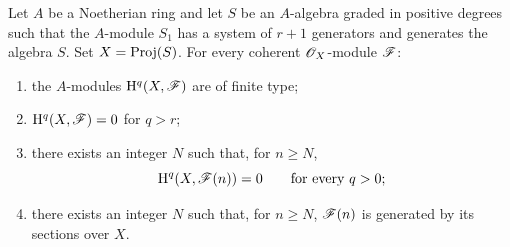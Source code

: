 \begin{proposition}[2.2.2]
\label{III.2.2.2}
Let $A$ be a Noetherian ring and let $S$ be an $A$-algebra graded in positive degrees such that the $A$-module $S_1$ has a system of $r+1$ generators and generates the algebra $S$.
Set $X=\operatorname{Proj}(S)$.
For every coherent $\mathscr{O}_X$-module $\mathscr{F}$:
\begin{enumerate}
  \item[{\rm(i)}] the $A$-modules $\mathrm{H}^q(X,\mathscr{F})$ are of finite type;
  \item[{\rm(ii)}] $\mathrm{H}^q(X,\mathscr{F})=0$ for $q>r$;
  \item[{\rm(iii)}] there exists an integer $N$ such that, for $n\geq N$,
  \[
    \mathrm{H}^q(X,\mathscr{F}(n))=0
    \qquad\text{for every }q>0;
  \]
  \item[{\rm(iv)}] there exists an integer $N$ such that, for $n\geq N$, $\mathscr{F}(n)$ is generated by its sections over $X$.
\end{enumerate}
\end{proposition}

